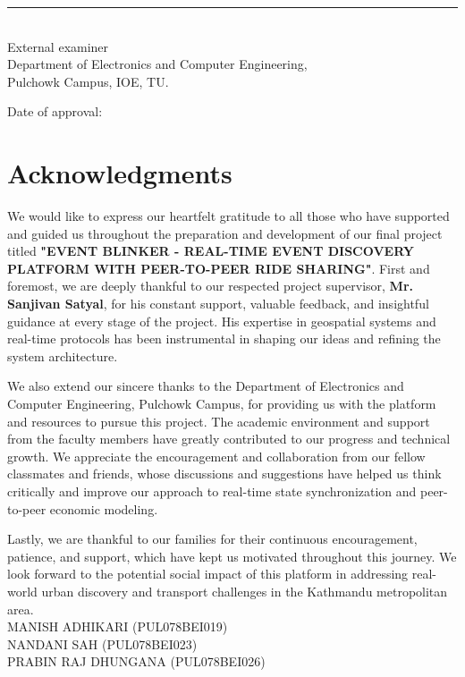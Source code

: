 \documentclass[12pt]{report}
\begin{document}
\vspace{1.2cm}

\begin{center}
    \rule{4cm}{0.4pt}\\
    External examiner\\[0.2cm]
    Department of Electronics and Computer Engineering,\\
    Pulchowk Campus, IOE, TU.
\end{center}

\vspace{0.8cm}

\begin{center}
    Date of approval:
\end{center}

\newpage
\chapter*{Acknowledgments}

We would like to express our heartfelt gratitude to all those who have supported and guided us throughout the preparation and development of our final project titled \textbf{"EVENT BLINKER - REAL-TIME EVENT DISCOVERY PLATFORM WITH PEER-TO-PEER RIDE SHARING"}. First and foremost, we are deeply thankful to our respected project supervisor, \textbf{Mr. Sanjivan Satyal}, for his constant support, valuable feedback, and insightful guidance at every stage of the project. His expertise in geospatial systems and real-time protocols has been instrumental in shaping our ideas and refining the system architecture.

We also extend our sincere thanks to the Department of Electronics and Computer Engineering, Pulchowk Campus, for providing us with the platform and resources to pursue this project. The academic environment and support from the faculty members have greatly contributed to our progress and technical growth. We appreciate the encouragement and collaboration from our fellow classmates and friends, whose discussions and suggestions have helped us think critically and improve our approach to real-time state synchronization and peer-to-peer economic modeling.

Lastly, we are thankful to our families for their continuous encouragement, patience, and support, which have kept us motivated throughout this journey. We look forward to the potential social impact of this platform in addressing real-world urban discovery and transport challenges in the Kathmandu metropolitan area.\vspace{2 cm} \\ 
MANISH ADHIKARI (PUL078BEI019)\\
NANDANI SAH (PUL078BEI023)\\
PRABIN RAJ DHUNGANA (PUL078BEI026)
\end{document}
